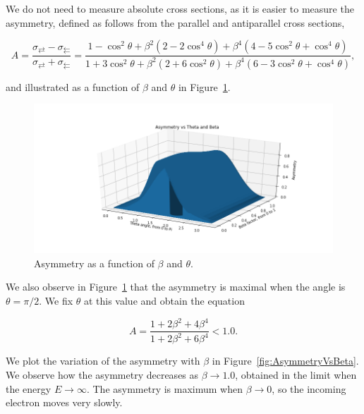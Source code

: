 \documentclass[10pt,swedish, openany]{book}
\begin{document}
We do not need to measure absolute cross sections, as it is easier to measure the asymmetry, defined as follows from the parallel and antiparallel cross sections, 

\begin{equation}\label{27}
    A = \frac{\sigma_{\rightleftarrows}-\sigma_{\leftleftarrows}}{\sigma_{\rightleftarrows}+\sigma_{\leftleftarrows}} = \frac{1-\cos^2{\theta}+\beta^2(2-2\cos^4{\theta})+\beta^4(4-5\cos^2{\theta}+\cos^4{\theta})}{1+3\cos^2{\theta}+\beta^2(2+6\cos^2{\theta})+\beta^4(6-3\cos^2{\theta}+\cos^4{\theta})},
\end{equation}

and illustrated as a function of $\beta$ and $\theta$ in Figure~\ref{fig:Asymmetry}.

\begin{figure}[h]
\includegraphics[scale=0.5]{Asymmetry_vs_Theta_vs_Beta.png}
\centering
\caption{Asymmetry as a function of $\beta$ and $\theta$.}
\label{fig:Asymmetry}
\end{figure}

We also observe in Figure~\ref{fig:Asymmetry} that the asymmetry is maximal when the angle is $\theta=\pi/2$. We fix $\theta$ at this value and obtain the equation

\begin{equation}\label{27}
    A = \frac{1+2\beta^2+4\beta^4}{1+2\beta^2+6\beta^4} < 1.0.
\end{equation}

We plot the variation of the asymmetry with $\beta$ in Figure~\ref{fig:AsymmetryVsBeta}. We observe how the asymmetry decreases as $\beta \rightarrow 1.0$, obtained in the limit when the energy $E \rightarrow \infty$. The asymmetry is maximum when $\beta \rightarrow 0$, so the incoming electron moves very slowly.
\end{document}
